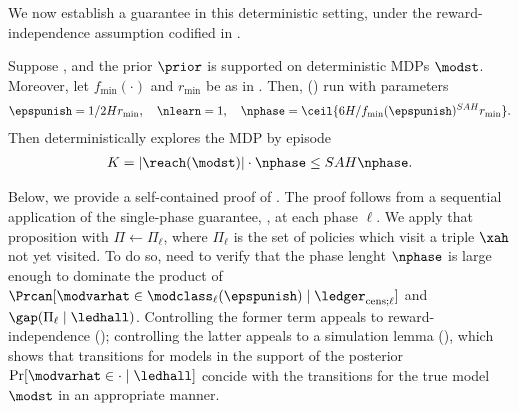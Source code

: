 We now establish a guarantee in this deterministic setting, under the reward-independence assumption codified in .
\begin{theorem}\label{thm:det_mdp} Suppose ,  and the prior $\prior$ is supported on deterministic MDPs $\modst$. Moreover,  let $f_{\min}(\cdot)$ and $r_{\min}$ be as in . Then, (\mdphh)  run with parameters
\begin{align*}
\epspunish = 1/2Hr_{\min},\quad \nlearn = 1, \quad \nphase = \ceil{6H/f_{\min}(\epspunish)^{SAH}r_{\min}}.
\end{align*} Then  \mdphh{} deterministically explores the MDP by episode
\begin{align*}
K = |\reach(\modst)|\cdot \nphase \le SAH\nphase.
\end{align*}
\end{theorem}
Below, we provide a self-contained proof of . The proof follows from a sequential application of the single-phase guarantee,  , at each phase $\ell$. We apply that proposition with $\Pi \gets \Pi_{\ell}$, where $\Pi_{\ell}$ is the set of policies which visit a triple $\xah$ not yet visited. To do so, need to verify that the phase lenght $\nphase$ is large enough to dominate the product of $\Prcan[\modvarhat \in \modclass_{\ell}(\epspunish) \mid \ledcensl]$ and $ \gap(\Pi_{\ell} \mid \ledhall)$. Controlling the former term appeals to reward-independence (); controlling the latter appeals to a simulation lemma (), which shows that transitions for models in the support of the posterior $\Pr[\modvarhat \in \cdot \mid \ledhall]$ concide with the transitions for the true model $\modst$ in an appropriate manner.


